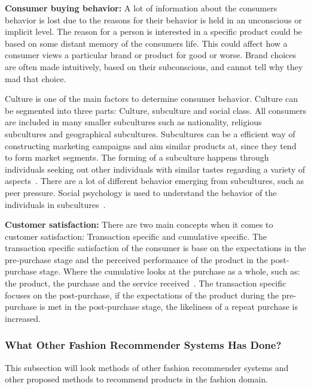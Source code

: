 \textbf{Consumer buying behavior:}
A lot of information about the consumers behavior is lost due to the reasons for their behavior is held in an unconscious or implicit level.
The reason for a person is interested in a specific product could be based on some distant memory of the consumers life.
This could affect how a consumer views a particular brand or product for good or worse.
Brand choices are often made intuitively, based on their subconscious, and cannot tell why they mad that choice.

Culture is one of the main factors to determine consumer behavior.
Culture can be segmented into three parts: Culture, subculture and social class.
All consumers are included in many smaller subcultures such as nationality, religious subcultures and geographical subcultures.
Subcultures can be a efficient way of constructing marketing campaigns and aim similar products at, since they tend to form market segments.
The forming of a subculture happens through individuals seeking out other individuals with similar tastes regarding a variety of aspects~\cite{vignali2009fashion}.
There are a lot of different behavior emerging from subcultures, such as peer pressure.
Social psychology is used to understand the behavior of the individuals in subcultures~\cite{vignali2009fashion}.

\textbf{Customer satisfaction:}
There are two main concepts when it comes to customer satisfaction:
Transaction specific and cumulative specific.
The transaction specific satisfaction of the consumer is base on the expectations in the pre-purchase stage and the perceived performance of the product in the post-purchase stage.
Where the cumulative looks at the purchase as a whole, such as: the product, the purchase and the service received~\cite{kumari2012}.
The transaction specific focuses on the post-purchase, if the expectations of the product during the pre-purchase is met in the post-purchase stage, the likeliness of a repeat purchase is increased.



\subsubsection{What Other Fashion Recommender Systems Has Done?}
This subsection will look methods of other fashion recommender systems and other proposed methods to recommend products in the fashion domain.

